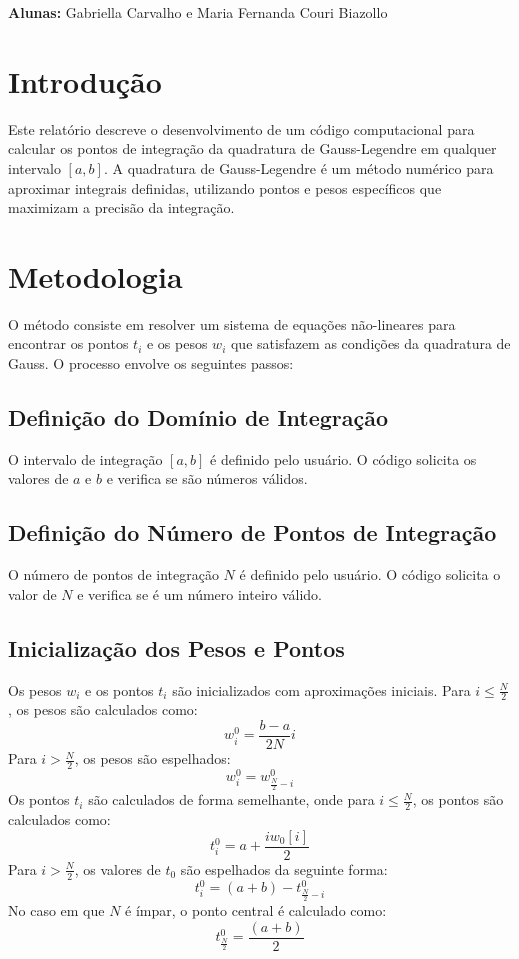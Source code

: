 \documentclass[12pt,letterpaper]{article}
\newcommand\NetIDb{Gabriella Carvalho e Maria Fernanda Couri Biazollo}     %
\begin{document}
%
%

\textbf{Alunas:} \NetIDb

\section{Introdução}
Este relatório descreve o desenvolvimento de um código computacional para calcular os pontos de integração da quadratura de Gauss-Legendre em qualquer intervalo \([a, b]\). A quadratura de Gauss-Legendre é um método numérico para aproximar integrais definidas, utilizando pontos e pesos específicos que maximizam a precisão da integração.

\section{Metodologia}
O método consiste em resolver um sistema de equações não-lineares para encontrar os pontos \(t_i\) e os pesos \(w_i\) que satisfazem as condições da quadratura de Gauss. O processo envolve os seguintes passos:

\subsection{Definição do Domínio de Integração}
O intervalo de integração \([a, b]\) é definido pelo usuário. O código solicita os valores de \(a\) e \(b\) e verifica se são números válidos.

\subsection{Definição do Número de Pontos de Integração}
O número de pontos de integração \(N\) é definido pelo usuário. O código solicita o valor de \(N\) e verifica se é um número inteiro válido.

\subsection{Inicialização dos Pesos e Pontos}
Os pesos \(w_i\) e os pontos \(t_i\) são inicializados com aproximações iniciais. Para \(i \leq \frac{N}{2}\), os pesos são calculados como:
\[
w_i^0 = \frac{b - a}{2N} i
\]
Para \(i > \frac{N}{2}\), os pesos são espelhados:
\[
w_i^0 = w_{\frac{N}{2} - i}^0
\]
Os pontos \(t_i\) são calculados de forma semelhante, onde para \(i \leq \frac{N}{2}\), os pontos são calculados como:
\[
t_i^0 = a + \frac{i w_0[i]}{2}
\]
Para \(i > \frac{N}{2}\), os valores de \(t_0\) são espelhados da seguinte forma:
\[
t_i^0 = (a + b) - t^0_{\frac{N}{2}-i}
\]
No caso em que \(N\) é ímpar, o ponto central é calculado como:
\[
t^0_{\frac{N}{2}} = \frac{(a + b)}{2}
\]
\end{document}
